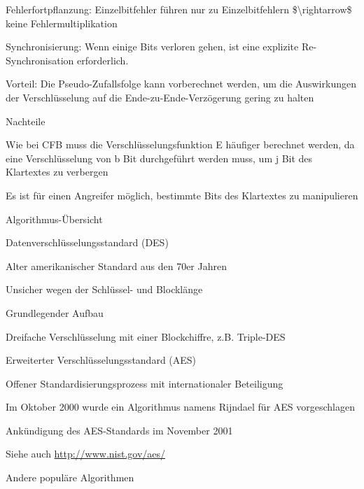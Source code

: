 \documentclass[a4paper]{article}
\begin{document}
\begin{multicols}{3}
\begin{itemize*}
            \begin{itemize*}
                  \item Fehlerfortpflanzung: Einzelbitfehler führen nur zu Einzelbitfehlern \$\textbackslash rightarrow\$ keine Fehlermultiplikation
                  \item Synchronisierung: Wenn einige Bits verloren gehen, ist eine explizite Re-Synchronisation erforderlich.
                  \item Vorteil: Die Pseudo-Zufallsfolge kann vorberechnet werden, um die Auswirkungen der Verschlüsselung auf die Ende-zu-Ende-Verzögerung gering zu halten
                  \item Nachteile
                  \begin{itemize*} \item Wie bei CFB muss die Verschlüsselungsfunktion E häufiger berechnet werden, da eine Verschlüsselung von b Bit durchgeführt werden muss, um j Bit des Klartextes zu verbergen \item Es ist für einen Angreifer möglich, bestimmte Bits des Klartextes zu manipulieren \end{itemize*}
            \end{itemize*}
      \end{itemize*}

      Algorithmus-Übersicht

      \begin{itemize*}
            \item
            Datenverschlüsselungsstandard (DES)

            \begin{itemize*}
                  \item Alter amerikanischer Standard aus den 70er Jahren
                  \item Unsicher wegen der Schlüssel- und Blocklänge
                  \item Grundlegender Aufbau
                  \item Dreifache Verschlüsselung mit einer Blockchiffre, z.B. Triple-DES
            \end{itemize*}
            \item
            Erweiterter Verschlüsselungsstandard (AES)

            \begin{itemize*}
                  \item Offener Standardisierungsprozess mit internationaler Beteiligung
                  \item Im Oktober 2000 wurde ein Algorithmus namens Rijndael für AES vorgeschlagen
                  \item Ankündigung des AES-Standards im November 2001
                  \item Siehe auch \href{http://www.nist.gov/aes/}{http://www.nist.gov/aes/}
            \end{itemize*}
            \item
            Andere populäre Algorithmen


\end{itemize*}
\end{multicols}
\end{document}
